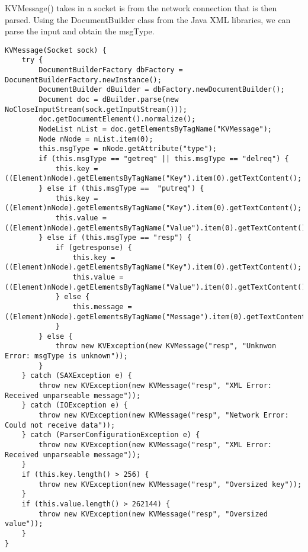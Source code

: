 \documentclass{article}
\begin{document}
KVMessage() takes in a socket is from the network connection that is then parsed. Using the DocumentBuilder class from the Java XML libraries, we can parse the input and obtain the msgType.
\begin{verbatim}
KVMessage(Socket sock) {
    try {
        DocumentBuilderFactory dbFactory = DocumentBuilderFactory.newInstance();
        DocumentBuilder dBuilder = dbFactory.newDocumentBuilder();
        Document doc = dBuilder.parse(new NoCloseInputStream(sock.getInputStream()));
        doc.getDocumentElement().normalize();
        NodeList nList = doc.getElementsByTagName("KVMessage");
        Node nNode = nList.item(0);
        this.msgType = nNode.getAttribute("type");
        if (this.msgType == "getreq" || this.msgType == "delreq") {
            this.key = ((Element)nNode).getElementsByTagName("Key").item(0).getTextContent();
        } else if (this.msgType ==  "putreq") {
            this.key = ((Element)nNode).getElementsByTagName("Key").item(0).getTextContent();
            this.value = ((Element)nNode).getElementsByTagName("Value").item(0).getTextContent();
        } else if (this.msgType == "resp") {
            if (getresponse) {
                this.key = ((Element)nNode).getElementsByTagName("Key").item(0).getTextContent();
                this.value = ((Element)nNode).getElementsByTagName("Value").item(0).getTextContent();
            } else {
                this.message = ((Element)nNode).getElementsByTagName("Message").item(0).getTextContent();
            }
        } else {
            throw new KVException(new KVMessage("resp", "Unknwon Error: msgType is unknown"));
        }
    } catch (SAXException e) {
        throw new KVException(new KVMessage("resp", "XML Error: Received unparseable message"));
    } catch (IOException e) {
        throw new KVException(new KVMessage("resp", "Network Error: Could not receive data"));
    } catch (ParserConfigurationException e) {
        throw new KVException(new KVMessage("resp", "XML Error: Received unparseable message"));
    }
    if (this.key.length() > 256) {
        throw new KVException(new KVMessage("resp", "Oversized key"));
    }
    if (this.value.length() > 262144) {
        throw new KVException(new KVMessage("resp", "Oversized value"));
    }
}
\end{verbatim}
\end{document}
